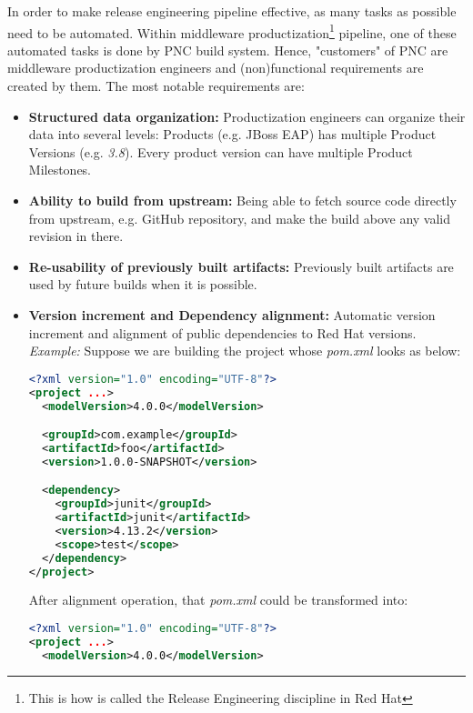 \documentclass[../main.tex]{subfiles}
\begin{document}
In order to make release engineering pipeline effective, as many tasks as possible need to be automated. Within middleware productization\footnote{This is how is called the Release Engineering discipline in Red Hat} pipeline, one of these automated tasks is done by PNC build system. Hence, "customers" of PNC are middleware productization engineers and (non)functional requirements are created by them. The most notable requirements are:

\begin{itemize}
  \item \textbf{Structured data organization:} Productization engineers can
organize their data into several levels: Products (e.g. JBoss EAP) has multiple Product Versions (e.g. \textit{3.8}). Every product version can have multiple Product Milestones.

  \item \textbf{Ability to build from upstream:} Being able to fetch source code directly from upstream, e.g. GitHub repository, and make the build above any valid revision in there.

  \item \textbf{Re-usability of previously built artifacts:} Previously built artifacts are used by future builds when it is possible.

  \item \textbf{Version increment and Dependency alignment:} Automatic version increment and  alignment of public dependencies to Red Hat versions.\\
  \textit{Example:} Suppose we are building the project whose \textit{pom.xml} looks as below:

\begin{lstlisting}[language=XML, caption=Original pom.xml]
<?xml version="1.0" encoding="UTF-8"?>
<project ...>
  <modelVersion>4.0.0</modelVersion>

  <groupId>com.example</groupId>
  <artifactId>foo</artifactId>
  <version>1.0.0-SNAPSHOT</version>

  <dependency>
    <groupId>junit</groupId>
    <artifactId>junit</artifactId>
    <version>4.13.2</version>
    <scope>test</scope>
  </dependency>
</project>
\end{lstlisting}

After alignment operation, that \textit{pom.xml} could be transformed into:
\begin{lstlisting}[language=XML, caption=Same pom.xml after alignment operation]
<?xml version="1.0" encoding="UTF-8"?>
<project ...>
  <modelVersion>4.0.0</modelVersion>


\end{lstlisting}
\end{itemize}
\end{document}
